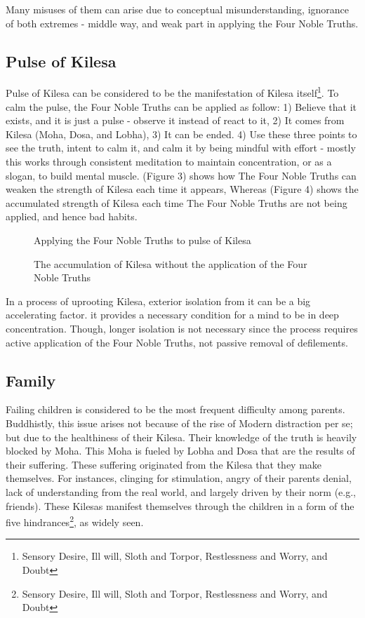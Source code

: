 \documentclass[12pt,a4paper]{article}
\begin{document}
	Many misuses of them can arise due to conceptual misunderstanding, ignorance of both extremes - middle way, and weak part in applying the Four Noble Truths.
	
	\subsection{Pulse of Kilesa}
	
	Pulse of Kilesa can be considered to be the manifestation of Kilesa itself\footnote{Sensory Desire, Ill will, Sloth and Torpor, Restlessness and Worry, and Doubt}. To calm the pulse, the Four Noble Truths can be applied as follow: 1) Believe that it exists, and it is just a pulse - observe it instead of react to it, 2) It comes from Kilesa (Moha, Dosa, and Lobha), 3) It can be ended. 4) Use these three points to see the truth, intent to calm it, and calm it by being mindful with effort - mostly this works through consistent meditation to maintain concentration, or as a slogan, to build mental muscle. (Figure 3) shows how The Four Noble Truths can weaken the strength of Kilesa each time it appears, Whereas (Figure 4) shows the accumulated strength of Kilesa each time The Four Noble Truths are not being applied, and hence bad habits.
	
	\begin{figure}[H]
		\centering
		
		\caption{Applying the Four Noble Truths to pulse of Kilesa}
	\end{figure}
	
	\begin{figure}[H]
		\centering
		
		\caption{The accumulation of Kilesa without the application of the Four Noble Truths}
	\end{figure}
	
	
	In a process of uprooting Kilesa, exterior isolation from it can be a big accelerating factor. it provides a necessary condition for a mind to be in deep concentration. Though, longer isolation is not necessary since the process requires active application of the Four Noble Truths, not passive removal of defilements.
	
	\subsection{Family}
	Failing children is considered to be the most frequent difficulty among parents. Buddhistly, this issue arises not because of the rise of Modern distraction per se; but due to the healthiness of their Kilesa. Their knowledge of the truth is heavily blocked by Moha. This Moha is fueled by Lobha and Dosa that are the results of their suffering. These suffering originated from the Kilesa that they make themselves. For instances, clinging for stimulation, angry of their parents denial, lack of understanding from the real world, and largely driven by their norm (e.g., friends). These Kilesas manifest themselves through the children in a form of the five hindrances\footnote{Sensory Desire, Ill will, Sloth and Torpor, Restlessness and Worry, and Doubt}, as widely seen.
	
\end{document}
